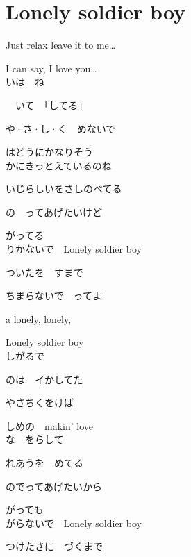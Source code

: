 \section{ Lonely soldier boy}
\large{

Just relax leave it to me…

I can say, I love you…
\\

いは　ね

　いて　「してる」

や·さ·し·く　めないで

はどうにかなりそう
\\

かにきっとえているのね

いじらしいをさしのべてる

の　ってあげたいけど

がってる
\\

りかないで　Lonely soldier boy

ついたを　すまで

ちまらないで　ってよ

a lonely, lonely,

Lonely soldier boy
\\

しがるで

のは　イかしてた

やさちくをけば

しめの　makin' love
\\

な　をらして

れあうを　めてる

のでってあげたいから

がっても
\\

がらないで　Lonely soldier boy

つけたさに　づくまで

}
